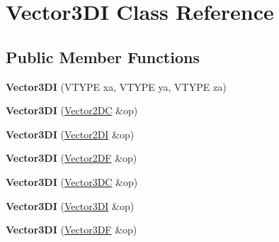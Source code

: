 \hypertarget{class_vector3_d_i}{\section{Vector3\+D\+I Class Reference}
\label{class_vector3_d_i}
}
\subsection*{Public Member Functions}
\begin{DoxyCompactItemize}
\item 
\hypertarget{class_vector3_d_i_a8376644ae3bd5df45209444b600ccec2}{{\bfseries Vector3\+D\+I} (V\+T\+Y\+P\+E xa, V\+T\+Y\+P\+E ya, V\+T\+Y\+P\+E za)}\label{class_vector3_d_i_a8376644ae3bd5df45209444b600ccec2}

\item 
\hypertarget{class_vector3_d_i_a92554fce2827be93f6b8042dfc7cc18b}{{\bfseries Vector3\+D\+I} (\hyperlink{class_vector2_d_c}{Vector2\+D\+C} \&op)}\label{class_vector3_d_i_a92554fce2827be93f6b8042dfc7cc18b}

\item 
\hypertarget{class_vector3_d_i_a0b8eebc30e3546cc93b6934dcc9daccf}{{\bfseries Vector3\+D\+I} (\hyperlink{class_vector2_d_i}{Vector2\+D\+I} \&op)}\label{class_vector3_d_i_a0b8eebc30e3546cc93b6934dcc9daccf}

\item 
\hypertarget{class_vector3_d_i_aa0e0833a895db1ee0ef28eb7541cdff8}{{\bfseries Vector3\+D\+I} (\hyperlink{class_vector2_d_f}{Vector2\+D\+F} \&op)}\label{class_vector3_d_i_aa0e0833a895db1ee0ef28eb7541cdff8}

\item 
\hypertarget{class_vector3_d_i_ab8f68238fcab54fb01c142f1c2c04601}{{\bfseries Vector3\+D\+I} (\hyperlink{class_vector3_d_c}{Vector3\+D\+C} \&op)}\label{class_vector3_d_i_ab8f68238fcab54fb01c142f1c2c04601}

\item 
\hypertarget{class_vector3_d_i_a8bd8fa93f78f4c43468ecdde4c8c5d96}{{\bfseries Vector3\+D\+I} (\hyperlink{class_vector3_d_i}{Vector3\+D\+I} \&op)}\label{class_vector3_d_i_a8bd8fa93f78f4c43468ecdde4c8c5d96}

\item 
\hypertarget{class_vector3_d_i_a9ebfa42c8d11a7b8d89dbd125ea5e174}{{\bfseries Vector3\+D\+I} (\hyperlink{class_vector3_d_f}{Vector3\+D\+F} \&op)}\label{class_vector3_d_i_a9ebfa42c8d11a7b8d89dbd125ea5e174}


\end{DoxyCompactItemize}
